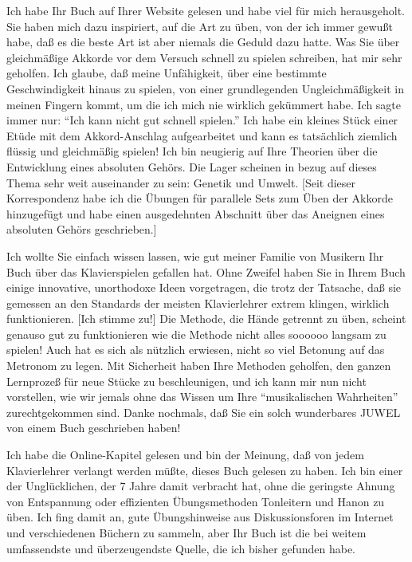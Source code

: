 \item \hypertarget{testimonials17}{}
Ich habe Ihr Buch auf Ihrer Website gelesen und habe viel für mich herausgeholt.
Sie haben mich dazu inspiriert, auf die Art zu üben, von der ich immer gewußt habe, daß es die beste Art ist aber niemals die Geduld dazu hatte.
Was Sie über gleichmäßige Akkorde vor dem Versuch schnell zu spielen schreiben, hat mir sehr geholfen.
Ich glaube, daß meine Unfähigkeit, über eine bestimmte Geschwindigkeit hinaus zu spielen, von einer grundlegenden Ungleichmäßigkeit in meinen Fingern kommt, um die ich mich nie wirklich gekümmert habe.
Ich sagte immer nur: \enquote{Ich kann nicht gut schnell spielen.}
Ich habe ein kleines Stück einer Etüde mit dem Akkord-Anschlag aufgearbeitet und kann es tatsächlich ziemlich flüssig und gleichmäßig spielen!
Ich bin neugierig auf Ihre Theorien über die Entwicklung eines absoluten Gehörs.
Die Lager scheinen in bezug auf dieses Thema sehr weit auseinander zu sein: Genetik und Umwelt.
[Seit dieser Korrespondenz habe ich die Übungen für parallele Sets zum Üben der Akkorde hinzugefügt und habe einen ausgedehnten Abschnitt über das Aneignen eines absoluten Gehörs geschrieben.]


\item \hypertarget{testimonials18}{}
Ich wollte Sie einfach wissen lassen, wie gut meiner Familie von Musikern Ihr Buch über das Klavierspielen gefallen hat.
Ohne Zweifel haben Sie in Ihrem Buch einige innovative, unorthodoxe Ideen vorgetragen, die trotz der Tatsache, daß sie gemessen an den Standards der meisten Klavierlehrer extrem klingen, wirklich funktionieren.
[Ich stimme zu!]
Die Methode, die Hände getrennt zu üben, scheint genauso gut zu funktionieren wie die Methode nicht alles soooooo langsam zu spielen!
Auch hat es sich als nützlich erwiesen, nicht so viel Betonung auf das Metronom zu legen.
Mit Sicherheit haben Ihre Methoden geholfen, den ganzen Lernprozeß für neue Stücke zu beschleunigen, und ich kann mir nun nicht vorstellen, wie wir jemals ohne das Wissen um Ihre \enquote{musikalischen Wahrheiten} zurechtgekommen sind.
Danke nochmals, daß Sie ein solch wunderbares JUWEL von einem Buch geschrieben haben!


\item \hypertarget{testimonials19}{}
Ich habe die Online-Kapitel gelesen und bin der Meinung, daß von jedem Klavierlehrer verlangt werden müßte, dieses Buch gelesen zu haben.
Ich bin einer der Unglücklichen, der 7 Jahre damit verbracht hat, ohne die geringste Ahnung von Entspannung oder effizienten Übungsmethoden Tonleitern und Hanon zu üben.
Ich fing damit an, gute Übungshinweise aus Diskussionsforen im Internet und verschiedenen Büchern zu sammeln, aber Ihr Buch ist die bei weitem umfassendste und überzeugendste Quelle, die ich bisher gefunden habe.


